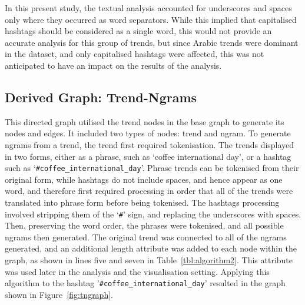 \documentclass{comjnl}
\begin{document}
In this present study, the textual analysis accounted for underscores and spaces only where they occurred as word separators. While this implied that capitalised hashtags should be considered as a single word, this would not provide an accurate analysis for this group of trends, but since Arabic trends were dominant in the dataset, and only capitalised hashtags were affected, this was not anticipated to have an impact on the results of the analysis.


\subsection{Derived Graph: Trend-Ngrams}

This directed graph utilised the trend nodes in the base graph to generate its nodes and edges. It included two types of nodes: trend and ngram. To generate ngrams from a trend, the trend first required tokenisation. The trends displayed in two forms, either as a phrase, such as `coffee international day', or a hashtag such as `{\texttt{\#coffee\_international\_day}}'.  Phrase trends can be tokenised from their original form, while hashtags do not include spaces, and hence appear as one word, and therefore first required processing in order that all of the trends were translated into phrase form before being tokenised. The hashtags processing involved stripping them of the `{\texttt{\#}}' sign, and replacing the underscores with spaces. Then, preserving the word order, the phrases were tokenised, and all possible ngrams then generated.  The original trend was connected to all of the ngrams generated, and an additional length attribute was added to each node within the graph, as shown in lines five and seven in Table~\ref{tbl:algorithm2}.  This attribute was used later in the analysis and the visualisation setting. Applying this algorithm to the hashtag '{\texttt{\#coffee\_international\_day}}' resulted in the graph shown in Figure~\ref{fig:tngraph}.
\end{document}
